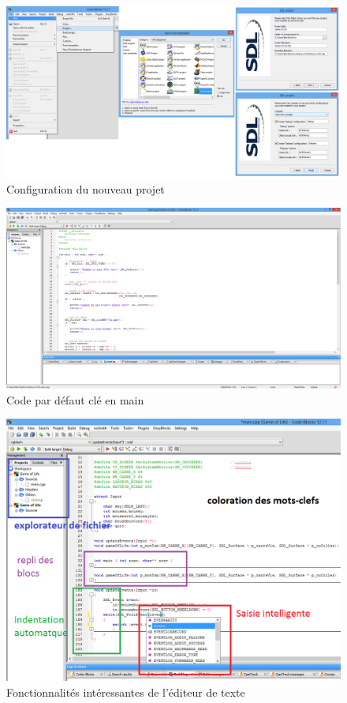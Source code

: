 \documentclass[a4paper, 12pt]{article}
\begin{document}
\begin{doublespace}
\begin{figure}
\includegraphics[scale=0.35]{./images/cb02.png}
\caption{Configuration du nouveau projet}				
\label{cb02}				
\end{figure}

\begin{figure}
\includegraphics[scale=0.35]{./images/cb03.png}
\caption{Code par défaut clé en main}				
\label{cb03}				
\end{figure}

\begin{figure}
\includegraphics[scale=0.55]{./images/cb04.png}
\caption{Fonctionnalités intéressantes de l'éditeur de texte}				
\label{cb04}				
\end{figure}


\end{doublespace}
\end{document}
